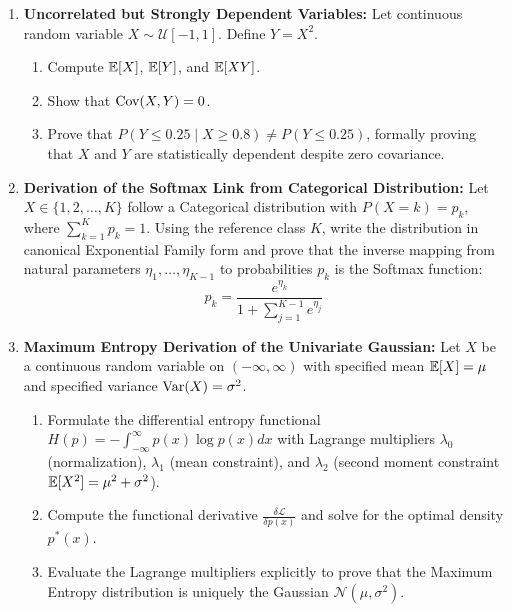 \begin{enumerate}[label=\textbf{P\arabic*.}]
    \item \textbf{Uncorrelated but Strongly Dependent Variables:}
    Let continuous random variable $X \sim \mathcal{U}[-1, 1]$. Define $Y = X^2$.
    \begin{enumerate}[label=(\alph*)]
        \item Compute $\operatorname{\mathbb{E}}[X]$, $\operatorname{\mathbb{E}}[Y]$, and $\operatorname{\mathbb{E}}[XY]$.
        \item Show that $\operatorname{Cov}(X, Y) = 0$.
        \item Prove that $P(Y \le 0.25 \mid X \ge 0.8) \ne P(Y \le 0.25)$, formally proving that $X$ and $Y$ are statistically dependent despite zero covariance.
    \end{enumerate}

    \item \textbf{Derivation of the Softmax Link from Categorical Distribution:}
    Let $X \in \{1, 2, \dots, K\}$ follow a Categorical distribution with $P(X = k) = p_k$, where $\sum_{k=1}^K p_k = 1$.
    Using the reference class $K$, write the distribution in canonical Exponential Family form and prove that the inverse mapping from natural parameters $\eta_1, \dots, \eta_{K-1}$ to probabilities $p_k$ is the Softmax function:
    \begin{equation}
    p_k = \frac{e^{\eta_k}}{1 + \sum_{j=1}^{K-1} e^{\eta_j}}
    \end{equation}

    \item \textbf{Maximum Entropy Derivation of the Univariate Gaussian:}
    Let $X$ be a continuous random variable on $(-\infty, \infty)$ with specified mean $\operatorname{\mathbb{E}}[X] = \mu$ and specified variance $\operatorname{Var}(X) = \sigma^2$.
    \begin{enumerate}[label=(\alph*)]
        \item Formulate the differential entropy functional $H(p) = -\int_{-\infty}^\infty p(x)\log p(x) dx$ with Lagrange multipliers $\lambda_0$ (normalization), $\lambda_1$ (mean constraint), and $\lambda_2$ (second moment constraint $\operatorname{\mathbb{E}}[X^2] = \mu^2 + \sigma^2$).
        \item Compute the functional derivative $\frac{\delta \mathcal{L}}{\delta p(x)}$ and solve for the optimal density $p^*(x)$.
        \item Evaluate the Lagrange multipliers explicitly to prove that the Maximum Entropy distribution is uniquely the Gaussian $\mathcal{N}(\mu, \sigma^2)$.
    \end{enumerate}


\end{enumerate}
